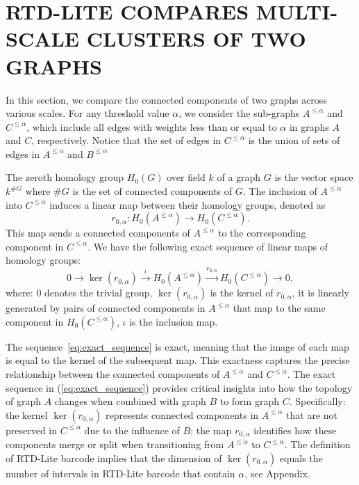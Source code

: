 \documentclass[twoside]{article}
\begin{document}
\section{RTD-LITE COMPARES MULTI-SCALE CLUSTERS OF TWO GRAPHS}

\label{sec:properties}





In this section, we  compare the connected components of two graphs across various scales.
For any threshold value \(\alpha\), we consider the sub-graphs \(A^{\leq\alpha}\) and \(C^{\leq\alpha}\), which include all edges with weights less than or equal to \(\alpha\) in graphs \(A\) and \(C\), respectively. Notice that the set of edges in \(C^{\leq\alpha}\) is the union of sets of edges in \(A^{\leq\alpha}\) and \(B^{\leq\alpha}\)



The zeroth homology group \(H_0(G)\) over field $k$ of a graph \(G\) is the vector space $k^{\texttt{\#}G}$ where $\texttt{\#}G$ is the set of connected components of $G$. The inclusion of \(A^{\leq\alpha}\) into \(C^{\leq\alpha}\) induces a linear map between their homology groups, denoted as
\[
r_{0,\alpha}: H_0(A^{\leq\alpha}) \rightarrow H_0(C^{\leq\alpha}).
\]
This map sends a connected components of \(A^{\leq\alpha}\) to the  corresponding component in \(C^{\leq\alpha}\).
We have the following exact sequence of linear maps of homology groups:
\begin{equation}
    0 \xrightarrow{} \ker(r_{0,\alpha}) \xrightarrow{\iota} H_0(A^{\leq\alpha}) \xrightarrow{r_{0,\alpha}} H_0(C^{\leq\alpha}) \xrightarrow{} 0,
    \label{eq:exact_sequence}
\end{equation}
where:
 \(0\) denotes the trivial group, \(\ker(r_{0,\alpha})\) is the kernel of \(r_{0,\alpha}\), it is linearly generated by pairs  of connected components in \(A^{\leq\alpha}\) that map to the same component in \(H_0(C^{\leq\alpha})\),  \(\iota\) is the inclusion map.

The sequence~\ref{eq:exact_sequence} is exact, meaning that the image of each map is equal to the kernel of the subsequent map. This exactness captures the precise relationship between the connected components of \(A^{\leq\alpha}\) and \(C^{\leq\alpha}\).
The exact sequence in (\ref{eq:exact_sequence}) provides critical insights into how the topology of graph \(A\) changes when combined with graph \(B\) to form graph \(C\). Specifically: the kernel \(\ker(r_{0,\alpha})\) represents connected components in \(A^{\leq\alpha}\) that are not preserved in \(C^{\leq\alpha}\) due to the influence of \(B\);
the map \(r_{0,\alpha}\) identifies how these components merge or split when transitioning from \(A^{\leq\alpha}\) to \(C^{\leq\alpha}\). The definition of RTD-Lite barcode implies that the dimension of \(\ker(r_{0,\alpha})\) equals the number of intervals in  RTD-Lite barcode that contain $\alpha$, see Appendix.
\end{document}

